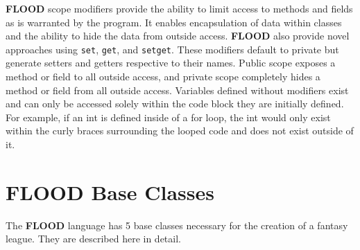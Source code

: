 \documentclass[12pt]{report}
\begin{document}
\begin{doublespace}
\textbf{FLOOD} scope modifiers provide the ability to limit access to methods and fields as is warranted by the program. It enables encapsulation of data within classes and the ability to hide the data from outside access. \textbf{FLOOD} also provide novel approaches using \texttt{set}, \texttt{get}, and \texttt{setget}. These modifiers default to private but generate setters and getters respective to their names.  Public scope exposes a method or field to all outside access, and private scope completely hides a method or field from all outside access. Variables defined without modifiers exist and can only be accessed solely within the code block they are initially defined. For example, if an int is defined inside of a for loop, the int would only exist within the curly braces surrounding the looped code and does not exist outside of it.
\end{doublespace}

\section{FLOOD Base Classes}

\begin{doublespace}
The \textbf{FLOOD} language has 5 base classes necessary for the creation of a fantasy league. They are described here in detail.
\end{doublespace}
\end{document}
